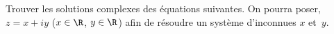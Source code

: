 \begin{exercice}
 Trouver les solutions complexes des \'equations suivantes. On
  pourra poser, $z=x+iy$ ($x\in\R$, $y\in\R$) afin de r\'esoudre un
  syst\`eme d'inconnues $x$ et~$y$.\\
\noindent
{}
  
 \end{exercice}
